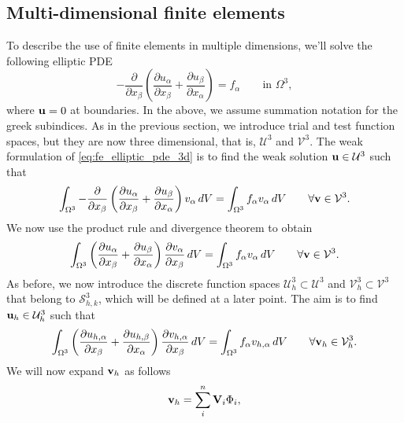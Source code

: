 \documentclass[oneside,a4paper,11pt]{report}
\begin{document}
\subsection{Multi-dimensional finite elements}
To describe the use of finite elements in multiple dimensions, we'll solve the following elliptic PDE
\begin{equation}
    \label{eq:fe_elliptic_pde_3d}
    -\frac{\partial}{\partial x_\beta} \left ( \frac{\partial u_\alpha}{\partial x_\beta} + \frac{\partial u_\beta}{\partial x_\alpha} \right ) = f_\alpha \qquad \text{in } \Omega^3,
\end{equation}
where $\mathbf{u} = 0$ at boundaries. In the above, we assume summation notation for the greek subindices. As in the previous section, we introduce trial and test function spaces, but they are now three dimensional, that is, $\mathcal{U}^3$ and $\mathcal{V}^3$. The weak formulation of \cref{eq:fe_elliptic_pde_3d} is to find the weak solution $\mathbf{u} \in \mathcal{U}^3$ such that
\begin{equation}
    \int_{\Omega^3} -\frac{\partial}{\partial x_\beta} \left ( \frac{\partial u_\alpha}{\partial x_\beta} + \frac{\partial u_\beta}{\partial x_\alpha} \right ) v_\alpha \, dV = \int_{\Omega^3} f_\alpha v_\alpha \,dV \qquad \forall \mathbf{v} \in \mathcal{V}^3.
\end{equation}
We now use the product rule and divergence theorem to obtain
\begin{equation}
    \int_{\Omega^3}  \left ( \frac{\partial u_\alpha}{\partial x_\beta} + \frac{\partial u_\beta}{\partial x_\alpha} \right ) \frac{\partial v_\alpha}{\partial x_\beta} \, dV = \int_{\Omega^3} f_\alpha v_\alpha \,dV \qquad \forall \mathbf{v} \in \mathcal{V}^3.
\end{equation}
As before, we now introduce the discrete function spaces $\mathcal{U}_h^3 \subset \mathcal{U}^3$ and $\mathcal{V}^3_h \subset \mathcal{V}^3$ that belong to $\mathcal{S}_{h,k}^3$, which will be defined at a later point. The aim is to find $\mathbf{u}_h \in \mathcal{U}_h^3$ such that
\begin{equation}
    \int_{\Omega^3}  \left ( \frac{\partial u_{h,\alpha}}{\partial x_\beta} + \frac{\partial u_{h,\beta}}{\partial x_\alpha} \right ) \frac{\partial v_{h,\alpha}}{\partial x_\beta} \, dV = \int_{\Omega^3} f_\alpha v_{h,\alpha} \,dV \qquad \forall \mathbf{v}_h \in \mathcal{V}_h^3.
\end{equation}
We will now expand $\mathbf{v}_h$ as follows
\begin{equation}
    \mathbf{v}_h = \sum_i^n \mathbf{V}_i \Phi_i,
\end{equation}
\end{document}
